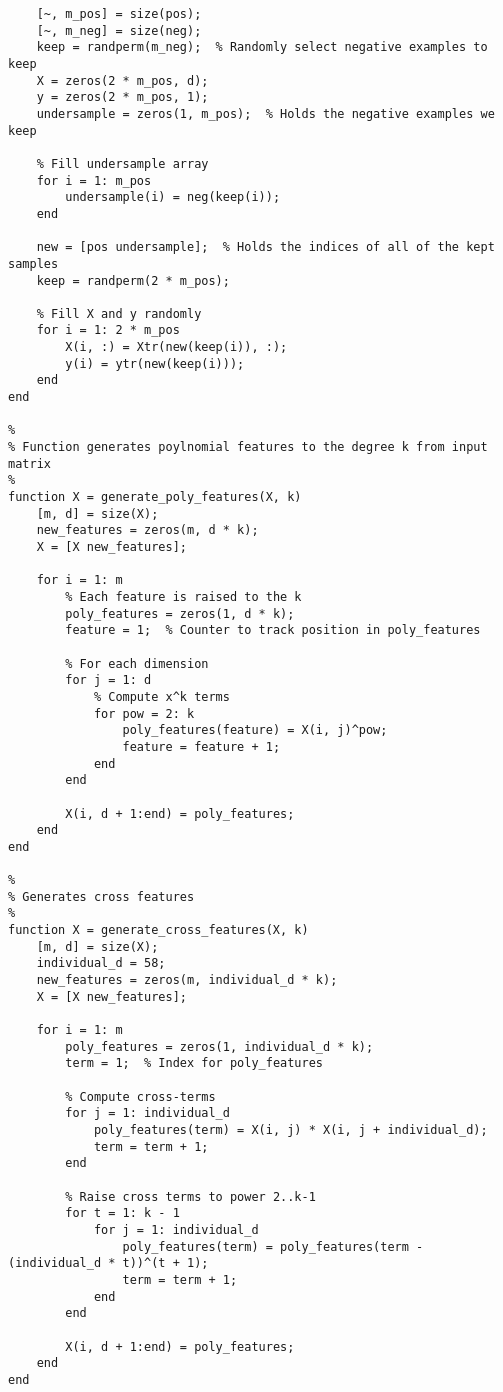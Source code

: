 \documentclass[11pt, oneside]{article}   	%
\begin{document}
\begin{verbatim}
    [~, m_pos] = size(pos);
    [~, m_neg] = size(neg);
    keep = randperm(m_neg);  % Randomly select negative examples to keep
    X = zeros(2 * m_pos, d);
    y = zeros(2 * m_pos, 1);
    undersample = zeros(1, m_pos);  % Holds the negative examples we keep
    
    % Fill undersample array
    for i = 1: m_pos
        undersample(i) = neg(keep(i));
    end
    
    new = [pos undersample];  % Holds the indices of all of the kept samples
    keep = randperm(2 * m_pos);
    
    % Fill X and y randomly
    for i = 1: 2 * m_pos
        X(i, :) = Xtr(new(keep(i)), :);
        y(i) = ytr(new(keep(i)));
    end
end

%
% Function generates poylnomial features to the degree k from input matrix
%
function X = generate_poly_features(X, k)
    [m, d] = size(X);
    new_features = zeros(m, d * k);
    X = [X new_features];
    
    for i = 1: m
        % Each feature is raised to the k
        poly_features = zeros(1, d * k);
        feature = 1;  % Counter to track position in poly_features
        
        % For each dimension
        for j = 1: d
            % Compute x^k terms
            for pow = 2: k
                poly_features(feature) = X(i, j)^pow;
                feature = feature + 1;
            end
        end
        
        X(i, d + 1:end) = poly_features;
    end
end

%
% Generates cross features
%
function X = generate_cross_features(X, k)
    [m, d] = size(X);
    individual_d = 58;
    new_features = zeros(m, individual_d * k);
    X = [X new_features];
    
    for i = 1: m
        poly_features = zeros(1, individual_d * k);
        term = 1;  % Index for poly_features
        
        % Compute cross-terms
        for j = 1: individual_d
            poly_features(term) = X(i, j) * X(i, j + individual_d);
            term = term + 1;
        end
        
        % Raise cross terms to power 2..k-1
        for t = 1: k - 1
            for j = 1: individual_d
                poly_features(term) = poly_features(term - (individual_d * t))^(t + 1);
                term = term + 1;
            end
        end
        
        X(i, d + 1:end) = poly_features;
    end
end
\end{verbatim}
\end{document}
